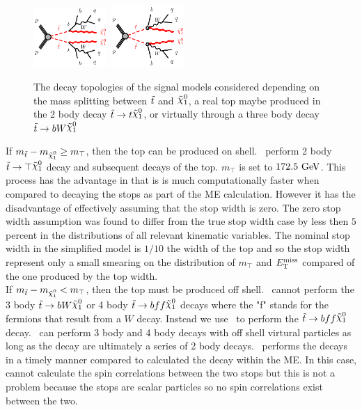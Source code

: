 \begin{figure}[htb]
  \begin{center}
    \includegraphics[width=0.25\textwidth]{figures/feynDiag/stst-bqqbqqN1N1-tt.eps}\hspace{0.05\textwidth}
    \includegraphics[width=0.25\textwidth]{figures/feynDiag/stst-bqqbqqN1N1-3body.eps}\hspace{0.05\textwidth}
\end{center}
\caption{The decay topologies of the signal models considered depending on the mass splitting between $\tilde{t}$ and $\ninoone$, a real top maybe produced in the 2 body decay $\stop\rightarrow t\ninoone$, or virtually through a three body decay ${\stop}\rightarrow bW\ninoone$}
\label{fig:feynDiagModels} 
\end{figure}

\indent If $m_{\stop} - m_{\ninoone} \ge m_{\top}$, then the top can be produced on shell. \pythiaeight\ perform 2 body ${\stop} \rightarrow \top \ninoone$ decay and subsequent decays of the top.  $m_{\top}$ is set to $172.5 \gev$.  This process has the advantage in that is is much computationally faster when compared to decaying the stops as part of the ME calculation.  However it has the disadvantage of effectively assuming that the stop width is zero.  The zero stop width assumption was found to differ from the true stop width case by less then $5$ percent in the distributions of all relevant kinematic variables.  The nominal stop width in the simplified model is $1/10$ the width of the top and so the stop width represent only a small smearing on the distribution of $m_{\top}$ and $E_{\mathrm{T}}^{\mathrm{miss}}$ compared of the one produced by the top width. \\

\indent If $m_{\stop} - m_{\ninoone} < m_{\top}$, then the top must be produced off shell.   \pythiaeight\ cannot perform the 3 body $\stop \rightarrow b W \ninoone$ or 4 body $\stop \rightarrow b f f \ninoone$ decays where the "f" stands for the fermions that result from a $W$ decay.  Instead we use \madspin\ to perform the $\stop \rightarrow b ff \ninoone$ decay.  \madspin\ can perform 3 body and 4 body decays with off shell virtural particles as long as the decay are ultimately a series of 2 body decays.  \madspin\ performs the decays in a timely manner compared to calculated the decay within the ME.   In this case, \madspin cannot calculate the spin correlations between the two stops but this is not a problem because the stops are scalar particles so no spin correlations exist between the two. \\

